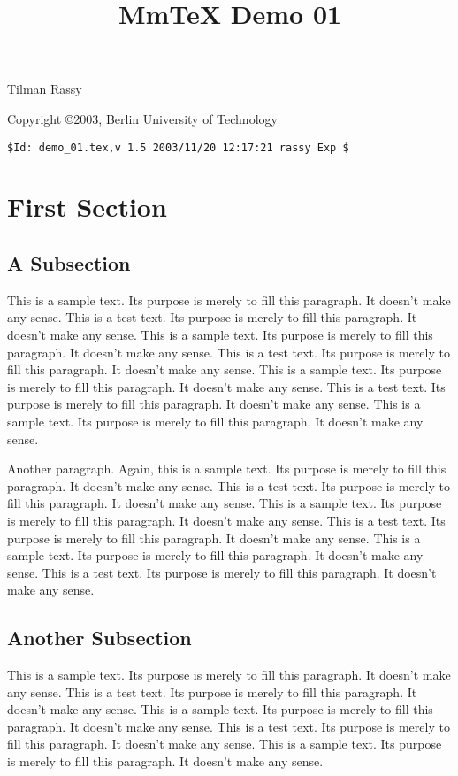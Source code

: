 \documentclass{webpage}
\begin{document}
\title{MmTeX Demo 01}

Tilman Rassy 

Copyright \copyright 2003, Berlin University of Technology

\verb'$Id: demo_01.tex,v 1.5 2003/11/20 12:17:21 rassy Exp $'

\tableofcontents

\section{First Section}

\subsection{A Subsection}

This is a sample text. Its purpose is merely to fill this paragraph. It doesn't
make any sense. This is a test text. Its purpose is merely to fill this
paragraph. It doesn't make any sense. This is a sample text. Its purpose is
merely to fill this paragraph. It doesn't make any sense. This is a test text.
Its purpose is merely to fill this paragraph. It doesn't make any sense. This
is a sample text. Its purpose is merely to fill this paragraph. It doesn't make
any sense. This is a test text. Its purpose is merely to fill this paragraph. It
doesn't make any sense. This is a sample text. Its purpose is merely to fill
this paragraph. It doesn't make any sense.

Another paragraph. Again, this is a sample text. Its purpose is merely to fill
this paragraph. It doesn't make any sense. This is a test text. Its purpose is
merely to fill this paragraph. It doesn't make any sense. This is a sample text.
Its purpose is merely to fill this paragraph. It doesn't make any sense.
This is a test text. Its purpose is merely to fill this paragraph. It doesn't
make any sense. This is a sample text. Its purpose is merely to fill this
paragraph. It doesn't make any sense. This is a test text. Its purpose is merely
to fill this paragraph. It doesn't make any sense.

\subsection{Another Subsection}

This is a sample text. Its purpose is merely to fill this paragraph. It doesn't
make any sense. This is a test text. Its purpose is merely to fill this
paragraph. It doesn't make any sense. This is a sample text. Its purpose is
merely to fill this paragraph. It doesn't make any sense. This is a test text.
Its purpose is merely to fill this paragraph. It doesn't make any sense. This is
a sample text. Its purpose is merely to fill this paragraph. It doesn't make any
sense.
\end{document}
